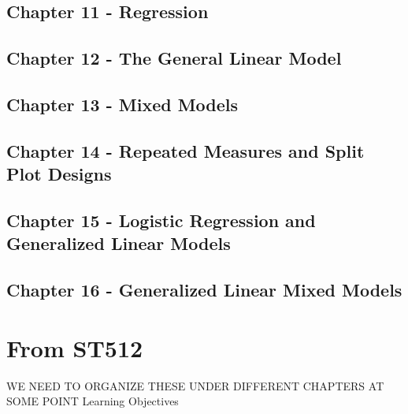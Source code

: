 \documentclass[
]{book}
\theoremstyle{definition}
\theoremstyle{definition}
\theoremstyle{definition}
\theoremstyle{remark}
\begin{document}
\hypertarget{chapter-11---regression}{%
\subsection{Chapter 11 - Regression}\label{chapter-11---regression}}

\hypertarget{chapter-12---the-general-linear-model}{%
\subsection{Chapter 12 - The General Linear Model}\label{chapter-12---the-general-linear-model}}

\hypertarget{chapter-13---mixed-models}{%
\subsection{Chapter 13 - Mixed Models}\label{chapter-13---mixed-models}}

\hypertarget{chapter-14---repeated-measures-and-split-plot-designs}{%
\subsection{Chapter 14 - Repeated Measures and Split Plot Designs}\label{chapter-14---repeated-measures-and-split-plot-designs}}

\hypertarget{chapter-15---logistic-regression-and-generalized-linear-models}{%
\subsection{Chapter 15 - Logistic Regression and Generalized Linear Models}\label{chapter-15---logistic-regression-and-generalized-linear-models}}

\hypertarget{chapter-16---generalized-linear-mixed-models}{%
\subsection{Chapter 16 - Generalized Linear Mixed Models}\label{chapter-16---generalized-linear-mixed-models}}

\hypertarget{from-st512}{%
\section{From ST512}\label{from-st512}}

WE NEED TO ORGANIZE THESE UNDER DIFFERENT CHAPTERS AT SOME POINT
Learning Objectives
\end{document}

